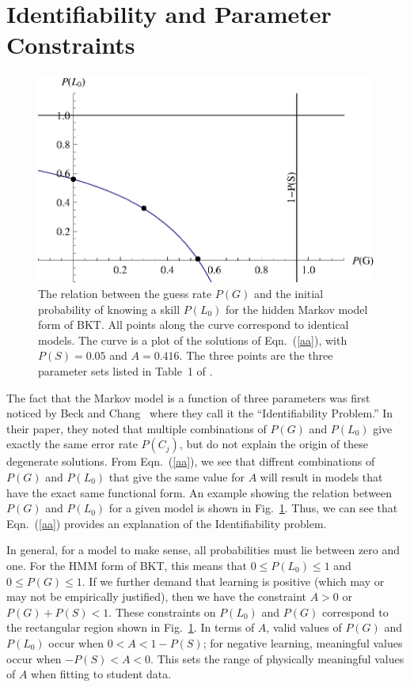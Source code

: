 \documentclass[jedm,acmnow]{acmtrans2m}
\begin{document}
\section{Identifiability and Parameter Constraints}

\begin{figure}
\centering\includegraphics{table1.eps}
\caption{The relation between the guess rate $P(G)$ and the initial
  probability of knowing a skill $P(L_0)$ for the hidden
  Markov model form of BKT.  All points along the curve correspond
  to identical models.
  The curve is a plot of the solutions of Eqn.~(\ref{aa}), with $P(S)=0.05$ and $A=0.416$.
  The three points are the three parameter sets listed in Table~1 of
  \protect\cite{beck_identifiability:_2007}.}
 \label{table1}
\end{figure}

The fact that the Markov model is a function of three parameters
was first noticed by Beck and Chang~\citeyear{beck_identifiability:_2007} 
where they call it the ``Identifiability Problem.''   In their paper, 
they noted that multiple combinations of $P(G)$ and $P(L_0)$ give
exactly the same error rate $P(C_j)$, but do not explain the origin of 
these degenerate solutions.  From Eqn.~(\ref{aa}), we see that diffrent
combinations of $P(G)$ and $P(L_0)$ that give the same value for
$A$ will result in models that have the exact same functional form.   
An example showing the relation
between $P(G)$ and $P(L_0)$ for a given model is shown in Fig.~\ref{table1}.
Thus, we can see that Eqn.~(\ref{aa}) provides an explanation
of the Identifiability problem.

In general, for a model to make sense, all probabilities must lie between 
zero and one.  For the HMM form of BKT, this means that $0\le P(L_0)\le 1$ and $0\le P(G) \le 1$.
If we further demand that learning is positive (which may or may not be
empirically justified), then we have the constraint $A>0$ or $P(G)+P(S)<1$.  
These constraints on $P(L_0)$ and $P(G)$ correspond to the rectangular
region shown in Fig.~\ref{table1}. 
In terms of $A$, valid values of $P(G)$ and $P(L_0)$ occur when
$0<A<1-P(S)$; for negative learning, meaningful values occur when
$-P(S)<A<0$.  This sets the range of physically meaningful values of
$A$ when fitting to student data.
\end{document}
